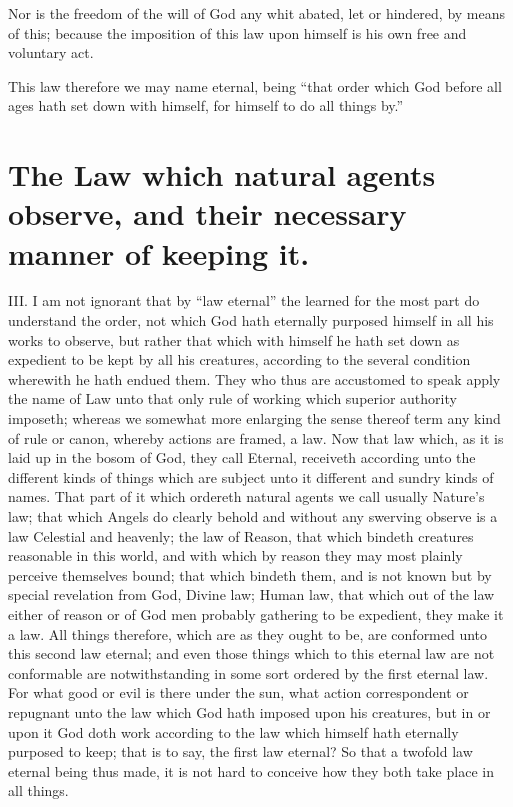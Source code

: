Nor is the freedom of the will of God any whit abated, let or hindered, by means of this; because the imposition of this law upon himself is his own free and voluntary act.

This law therefore we may name eternal, being “that order which God before all ages hath set down with himself, for himself to do all things by.”

\section*{The Law which natural agents observe, and their necessary manner of keeping it.}

III. I am not ignorant that by “law eternal” the learned for the most part do understand the order, not which God hath eternally purposed himself in all his works to observe,  but rather that which with himself he hath set down as expedient to be kept by all his creatures, according to the several condition wherewith he hath endued them. They who thus are accustomed to speak apply the name of Law unto that only rule of working which superior authority imposeth; whereas we somewhat more enlarging the sense thereof term any kind of rule or canon, whereby actions are framed, a law. Now that law which, as it is laid up in the bosom of God, they call Eternal, receiveth according unto the different kinds of things which are subject unto it different and sundry kinds of names. That part of it which ordereth natural agents we call usually Nature’s law; that which Angels do clearly behold and without any swerving observe is a law Celestial and heavenly; the law of Reason, that which bindeth creatures reasonable in this world, and with which by reason they may most plainly perceive themselves bound; that which bindeth them, and is not known but by special revelation from God, Divine law; Human law, that which out of the law either of reason or of God men probably gathering to be expedient, they make it a law. All things therefore, which are as they ought to be, are conformed unto this second law eternal; and even those things which to this eternal law are not conformable are notwithstanding in some sort ordered by the first eternal law. For what good or evil is there under the sun, what action correspondent or repugnant unto the law which God hath imposed upon his creatures, but in or upon it God doth work according to the law which himself hath eternally purposed to keep; that is to say, the first law eternal? So that a twofold law eternal being thus made, it is not hard to conceive how they both take place in all things.

